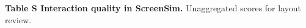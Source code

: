 \documentclass[10pt]{article}
\begin{document}
\newcommand{\ivgnotes}{}
\renewcommand{\ivgnote}[1]{\gdef\ivgnotes{#1}}

\par\vspace{6pt}
{\fontsize{8.8}{10.3}\selectfont\textsf{\textbf{Table S Interaction quality in ScreenSim.}} Unaggregated scores for layout review. \ivgnotes\par}
\end{document}
